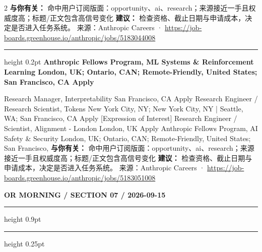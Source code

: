 \documentclass[10.5pt]{ctexart}
\begin{document}
\begin{multicols}{2}
\textbf{与你有关：} 命中用户订阅版面：opportunity、ai、research；来源接近一手且权威度高；标题/正文包含高信号变化
\textbf{建议：} 检查资格、截止日期与申请成本，决定是否进入任务系统。
{\footnotesize\color{ormuted} 来源：Anthropic Careers · \url{https://job-boards.greenhouse.io/anthropic/jobs/5183044008}}
\vspace{2mm}
\hrule height 0.2pt
\vspace{2mm}
{\large\bfseries Anthropic Fellows Program, ML Systems \& Reinforcement Learning London, UK; Ontario, CAN; Remote-Friendly, United States; San Francisco, CA Apply}\par
[Expression of Interest] Research Manager, Interpretability San Francisco, CA Apply Research Engineer / Research Scientist, Tokens New York City, NY; New York City, NY | Seattle, WA; San Francisco, CA Apply [Expression of Interest] Research Engineer / Scientist, Alignment - London London, UK Apply Anthropic Fellows Program, AI Safety \& Security London, UK; Ontario, CAN; Remote-Friendly, United States; San Francisco, 
\textbf{与你有关：} 命中用户订阅版面：opportunity、ai、research；来源接近一手且权威度高；标题/正文包含高信号变化
\textbf{建议：} 检查资格、截止日期与申请成本，决定是否进入任务系统。
{\footnotesize\color{ormuted} 来源：Anthropic Careers · \url{https://job-boards.greenhouse.io/anthropic/jobs/5183051008}}
\end{multicols}
\newpage
{\small\bfseries OR MORNING / SECTION 07 / 2026-09-15}
\vspace{2mm}
\hrule height 0.9pt
\vspace{1.5mm}
\hrule height 0.25pt
\vspace{4mm}
\end{document}
